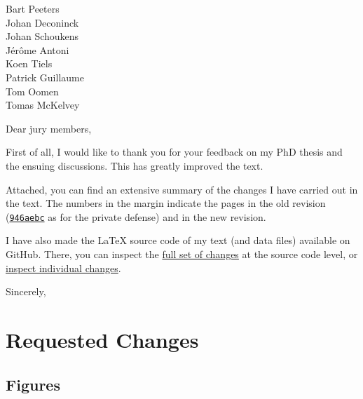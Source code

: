 \documentclass{responseletter}
\date{\today}
\begin{document}
\begin{letter}{%
Bart Peeters \\
Johan Deconinck \\
Johan Schoukens \\
Jérôme Antoni \\
Koen Tiels \\
Patrick Guillaume \\
Tom Oomen \\
Tomas McKelvey 
}

\opening{Dear jury members,}

First of all, I would like to thank you for your feedback on my PhD thesis and the ensuing discussions.
This has greatly improved the text.

Attached, you can find an extensive summary of the changes I have carried out in the text.
The numbers in the margin indicate the pages in the old revision (\href{https://github.com/egeerardyn/phdthesis/releases/tag/private-submit}{\texttt{946aebc}} as for the private defense) and in the new revision.

I have also made the \LaTeX{} source code of my text (and data files) available on GitHub.
There, you can inspect the \href{https://github.com/egeerardyn/phdthesis/compare/b6b273e...master}{full set of changes} at the source code level, or \href{https://github.com/egeerardyn/phdthesis/commits/master}{inspect individual changes}.

\closing{Sincerely,}
\end{letter}

\section{Requested Changes}

\subsection{Figures}
\end{document}
